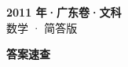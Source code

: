 \documentclass[zihao=-4, a4paper]{ctexart}
\begin{document}
\begin{center}
  {\Large\bfseries 2011 年·广东卷·文科}\\[4pt]
  {\large 数学 · 简答版}
\end{center}
\medskip
{}

\clearpage
{}
\begin{center}{\Large\bfseries 答案速查}\end{center}
\medskip

\end{document}

